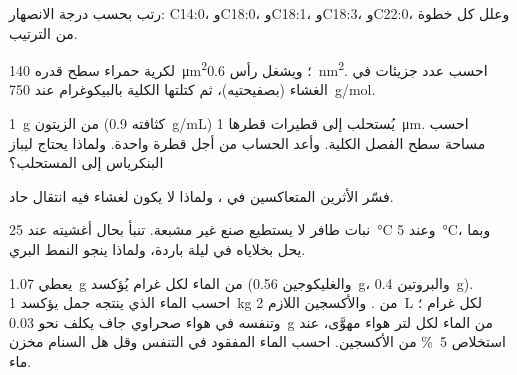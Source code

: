 \begin{exercise}[$\star\star$]\label{exo:b1:lipids:6}
رتب بحسب درجة الانصهار: C14:0، وC18:0، وC18:1، وC18:3، وC22:0، وعلل
كل خطوة من الترتيب.
\end{exercise}

\begin{exercise}[$\star\star$]\label{exo:b1:lipids:7}
لكرية حمراء سطح قدره \qty{140}{\micro m^2}؛ ويشغل رأس 
\qty{0.6}{nm^2}. احسب عدد جزيئات  في الغشاء (بصفيحتيه)،
ثم كتلتها الكلية بالبيكوغرام عند \qty{750}{g/mol}.
\end{exercise}

\begin{exercise}[$\star\star$]\label{exo:b1:lipids:8}
\qty{1}{g} من  الزيتون (كثافته \qty{0.9}{g/mL}) يُستحلب إلى
قطيرات قطرها \qty{1}{\micro m}. احسب مساحة سطح الفصل الكلية. وأعد
الحساب من أجل قطرة واحدة. ولماذا يحتاج ليباز البنكرياس إلى
المستحلب؟
\end{exercise}

\begin{exercise}[$\star\star$]\label{exo:b1:lipids:9}
فسّر الأثرين المتعاكسين  في ، ولماذا لا يكون
لغشاء فيه  انتقال حاد.
\end{exercise}

\begin{exercise}[$\star\star\star$]\label{exo:b1:lipids:10}
نبات طافر لا يستطيع صنع  غير مشبعة. تنبأ بحال أغشيته عند
\qty{25}{\celsius} وعند \qty{5}{\celsius}، وبما يحل بخلاياه في ليلة
باردة، ولماذا ينجو النمط البري.
\end{exercise}

\begin{exercise}[$\star\star\star$]\label{exo:b1:lipids:11}
يعطي  \qty{1.07}{g} من الماء لكل غرام يُؤكسد (والغليكوجين
\qty{0.56}{g}، والبروتين \qty{0.4}{g}). احسب الماء الذي ينتجه جمل
يؤكسد \qty{1}{kg} من . والأكسجين اللازم \qty{2}{L} لكل غرام
؛ وتنفسه في هواء صحراوي جاف يكلف نحو \qty{0.03}{g} من الماء لكل
لتر هواء مهوَّى، عند استخلاص \qty{5}{\%} من الأكسجين. احسب الماء
المفقود في التنفس وقل هل السنام مخزن ماء.
\end{exercise}

